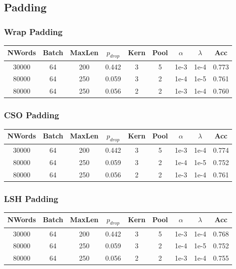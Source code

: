 \subsection{Padding}
\subsubsection{Wrap Padding}
\begin{center}\begin{tabular}{||c c c c c c c c c ||}
 \hline
 NWords & Batch & MaxLen & $p_{drop}$ & Kern & Pool & $\alpha$ & $\lambda$ & Acc\\ [0.5ex]
 \hline\hline
 30000 & 64 & 200 & 0.442 & 3 & 5 & 1e-3 & 1e-4 & 0.773\\
 \hline
 80000 & 64 & 250 & 0.059 & 3 & 2 & 1e-4 & 1e-5 & 0.761\\
 \hline
 80000 & 64 & 250 & 0.056 & 2 & 2 & 1e-3 & 1e-4 & 0.760\\
 [1ex]\hline\end{tabular}\end{center}

\subsubsection{CSO Padding}
\begin{center}\begin{tabular}{||c c c c c c c c c ||}
 \hline
 NWords & Batch & MaxLen & $p_{drop}$ & Kern & Pool & $\alpha$ & $\lambda$ & Acc\\ [0.5ex]
 \hline\hline
30000 & 64 & 200 & 0.442 & 3 & 5 & 1e-3 & 1e-4 & 0.774\\
\hline
80000 & 64 & 250 & 0.059 & 3 & 2 & 1e-4 & 1e-5 & 0.752\\
\hline
80000 & 64 & 250 & 0.056 & 2 & 2 & 1e-3 & 1e-4 & 0.761\\
 [1ex]\hline\end{tabular}\end{center}

\subsubsection{LSH Padding}
\begin{center}\begin{tabular}{||c c c c c c c c c ||}
 \hline
 NWords & Batch & MaxLen & $p_{drop}$ & Kern & Pool & $\alpha$ & $\lambda$ & Acc\\ [0.5ex]
 \hline\hline
 30000 & 64 & 200 & 0.442 & 3 & 5 & 1e-3 & 1e-4 & 0.768\\
 \hline
 80000 & 64 & 250 & 0.059 & 3 & 2 & 1e-4 & 1e-5 & 0.752\\
 \hline
 80000 & 64 & 250 & 0.056 & 2 & 2 & 1e-3 & 1e-4 & 0.755\\
 [1ex]\hline\end{tabular}\end{center}


